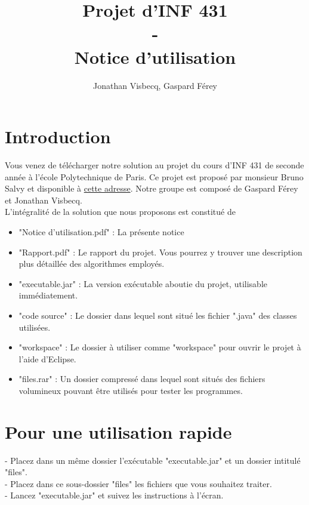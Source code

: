 \documentclass[12pt,a4paper,titlepage]{article}
\author{Jonathan Visbecq, Gaspard Férey}
\title{Projet d'INF 431 \\ - \\ Notice d'utilisation}
\begin{document}
\maketitle

\section{Introduction}
Vous venez de télécharger notre solution au projet du cours d'INF 431 de seconde année à l'école Polytechnique de Paris. Ce projet est proposé par monsieur Bruno Salvy et disponible à \href{http://perso.ens-lyon.fr/bruno.salvy/INF431/Projet/INF431_-_Projet_Informatique.html}{cette adresse}.
Notre groupe est composé de Gaspard Férey et Jonathan Visbecq.\\
L'intégralité de la solution que nous proposons est constitué de
\begin{itemize}
\item "Notice d'utilisation.pdf" : La présente notice
\item "Rapport.pdf" : Le rapport du projet. Vous pourrez y trouver une description plus détaillée des algorithmes employés. 
\item "executable.jar" : La version exécutable aboutie du projet, utilisable immédiatement.
\item "code source" : Le dossier dans lequel sont situé les fichier ".java" des classes utilisées.
\item "workspace" : Le dossier à utiliser comme "workspace" pour ouvrir le projet à l'aide d'Eclipse.
\item "files.rar" : Un dossier compressé dans lequel sont situés des fichiers volumineux pouvant être utilisés pour tester les programmes.
\end{itemize}


\section{Pour une utilisation rapide}
- Placez dans un même dossier l'exécutable "executable.jar" et un dossier intitulé "files".\\
- Placez dans ce sous-dossier "files" les fichiers que vous souhaitez traiter. \\
- Lancez "executable.jar" et suivez les instructions à l'écran.
\end{document}
